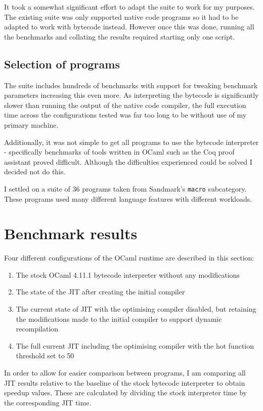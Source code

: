 It took a somewhat significant effort to adapt the suite to work for my purposes. The existing
suite was only supported native code programs so it had to be adapted to work with bytecode
instead. However once this was done, running all the benchmarks and collating the results required
starting only one script.

\subsection{Selection of programs}

The suite includes hundreds of benchmarks with support for tweaking benchmark parameters increasing
this even more. As interpreting the bytecode is significantly slower than running the output of the
native code compiler, the full execution time across the configurations tested was far too long to
be without use of my primary machine.

Additionally, it was not simple to get all programs to use the bytecode interpreter - specifically
benchmarks of tools written in OCaml such as the Coq proof assistant proved difficult. Although the
difficulties experienced could be solved I decided not do this.

I settled on a suite of 36 programs taken from Sandmark's \texttt{macro} subcategory. These
programs
used many different language features with different workloads.

\section{Benchmark results}

Four different configurations of the OCaml runtime are described in this section:

\begin{enumerate}
      \item The stock OCaml 4.11.1 bytecode interpreter without any modifications
      \item The state of the JIT after creating the initial compiler
      \item The current state of JIT with the optimising compiler disabled, but retaining
            the modifications made to the initial compiler to support dynamic recompilation
      \item The full current JIT including the optimising compiler with the hot function threshold
            set to 50
\end{enumerate}

In order to allow for easier comparison between programs, I am comparing all JIT results relative
to the baseline of the stock bytecode interpreter to obtain speedup values. These are calculated by
dividing the stock interpreter time by the corresponding JIT time.

